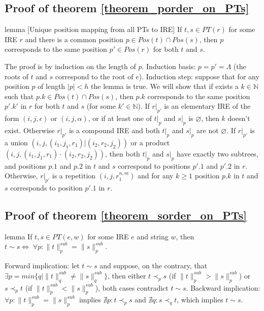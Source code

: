 \documentclass[AMA,STIX1COL]{WileyNJD-v2}
\newcommand{\YN}{\mathbb{N}}
\newcommand{\PT}{PT}
\newcommand{\snorm}[2]{\|{#1}\|^{sub}_{#2}}
\begin{document}
\subsection*{Proof of theorem \ref{theorem_porder_on_PTs}}

\begin{theoremEnd}{lemma}
[Unique position mapping from all PTs to IRE]
    \label{lemma_positions}
    If $t, s \in PT(r)$ for some IRE $r$
    and there is a common position $p \in Pos(t) \cap Pos(s)$,
    then $p$ corresponds to the same position $p' \in Pos(r)$ for both $t$ and $s$.
\end{theoremEnd}
\begin{proofEnd}
    The proof is by induction on the length of $p$.
    Induction basis: $p = p' = \Lambda$ (the roots of $t$ and $s$ correspond to the root of $e$).
    Induction step: suppose that for any position $p$ of length $|p| < h$ the lemma is true.
    We will show that if exists a $k \in \YN$ such that $p.k \in Pos(t) \cap Pos(s)$,
    then $p.k$ corresponds to the same position $p'.k'$ in $r$ for both $t$ and $s$ (for some $k' \in \YN$).
    If $r|_{p'}$ is an elementary IRE of the form $(i, j, \epsilon)$ or $(i, j, \alpha)$,
    or if at least one of $t|_p$ and $s|_p$ is $\varnothing$,
    then $k$ doesn't exist.
    Otherwise $r|_{p'}$ is a compound IRE and both $t|_p$ and $s|_p$ are not $\varnothing$.
    If $r|_{p'}$ is a union $(i, j, (i_1, j_1, r_1)|(i_2, r_2, j_2))$
    or a product $(i, j, (i_1, j_1, r_1)\cdot(i_2, r_2, j_2))$,
    then both $t|_p$ and $s|_p$ have exactly two subtrees,
    and positions $p.1$ and $p.2$ in $t$ and $s$ correspond to positions $p'.1$ and $p'.2$ in $r$.
    Otherwise, $r|_{p'}$ is a repetition $(i, j, r_1^{n,m})$
    and for any $k \geq 1$ position $p.k$ in $t$ and $s$ corresponds to position $p'.1$ in $r$.
\end{proofEnd}



\subsection*{Proof of theorem \ref{theorem_sorder_on_PTs}}

\begin{theoremEnd}{lemma}
    \label{lemma_incomparability_equivdef}
    If $t, s \in \PT(e, w)$ for some IRE $e$ and string $w$,
    then $t \sim s \Leftrightarrow \; \forall p : \snorm{t}{p} = \snorm{s}{p}$.
\end{theoremEnd}
\begin{proofEnd}
    Forward implication: let $t \sim s$ and suppose, on the contrary, that $\exists p = min \{ q \mid \snorm{t}{q} \neq \snorm{s}{q} \}$,
    then either $t \prec_p s$ (if $\snorm{t}{p} > \snorm{s}{p}$) or $s \prec_p t$ (if $\snorm{t}{p} < \snorm{s}{p}$),
    both cases contradict $t \sim s$.
    Backward implication: $\forall p : \snorm{t}{p} = \snorm{s}{p}$
    implies $\nexists p : t \prec_p s$ and $\nexists q : s \prec_q t$,
    which implies $t \sim s$.
\end{proofEnd}
\end{document}
